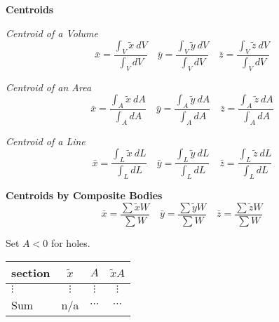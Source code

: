\documentclass[twocolumn]{article}
\begin{document}
\dotfill

\textbf{Centroids}

\textit{Centroid of a Volume}
\begin{equation*}
    \bar{x} = \frac{\displaystyle\int_V \tilde{x}\ dV}{\displaystyle\int_V dV} \hspace{1em} \bar{y} = \frac{\displaystyle\int_V \tilde{y}\ dV}{\displaystyle\int_V dV} \hspace{1em} \bar{z} = \frac{\displaystyle\int_V \tilde{z}\ dV}{\displaystyle\int_V dV}
\end{equation*}

\textit{Centroid of an Area}
\begin{equation*}
    \bar{x} = \frac{\displaystyle\int_A \tilde{x}\ dA}{\displaystyle\int_A dA} \hspace{1em} \bar{y} = \frac{\displaystyle\int_A \tilde{y}\ dA}{\displaystyle\int_A dA} \hspace{1em} \bar{z} = \frac{\displaystyle\int_A \tilde{z}\ dA}{\displaystyle\int_A dA}
\end{equation*}

\textit{Centroid of a Line}
\begin{equation*}
    \bar{x} = \frac{\displaystyle\int_L \tilde{x}\ dL}{\displaystyle\int_L dL} \hspace{1em} \bar{y} = \frac{\displaystyle\int_L \tilde{y}\ dL}{\displaystyle\int_L dL} \hspace{1em} \bar{z} = \frac{\displaystyle\int_L \tilde{z}\ dL}{\displaystyle\int_L dL}
\end{equation*}

\newpage

\textbf{Centroids by Composite Bodies}
\begin{equation*}
    \bar{x} = \frac{\sum \tilde{x} W}{\sum W} \hspace{1em} \bar{y} = \frac{\sum \tilde{y} W}{\sum W} \hspace{1em} \bar{z} = \frac{\sum \tilde{z} W}{\sum W}
\end{equation*}

Set $A < 0$ for holes.
\begin{table}[h]
    \begin{tabular}{l c c c}
        \hline \hline
        section & $\tilde{x}$ & $A$ & $\tilde{x}A$ \\
        \hline
        $\vdots$ & $\vdots$ & $\vdots$ & $\vdots$ \\
        \hline
        Sum & n/a & $\cdots$ & $\cdots$ \\
        \hline \hline
    \end{tabular}
\end{table} \vspace{-1em}
\end{document}
